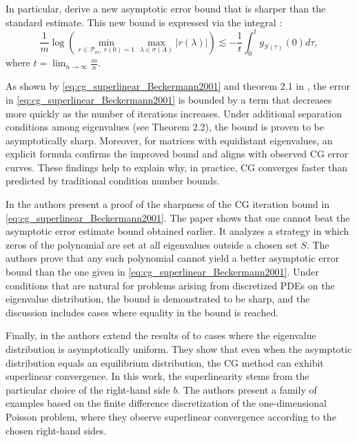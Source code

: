In particular, \citeauthor{cg_superlinear_Beckermann2001} derive a new asymptotic error bound that is sharper than the standard estimate. This new bound is expressed via the integral \cite[Equation 1.8]{cg_superlinear_Beckermann2001}:
\begin{equation}
    \frac{1}{m} \log \left(\min_{r\in\mathcal{P}_m, \ r(0)=1}\max_{\lambda \in \sigma(A)}|r(\lambda)|\right) \lesssim-\frac{1}{t} \int_0^t g_{S(\tau)}(0) d \tau,
    \label{eq:cg_superlinear_Beckermann2001}
\end{equation}
where $t = \lim_{n\to\infty}\frac{m}{n}$.

As shown by \cref{eq:cg_superlinear_Beckermann2001} and theorem 2.1 in \cite{cg_sharp_bound_Beckermann2001}, the error in \cref{eq:cg_superlinear_Beckermann2001} is bounded by a term that decreases more quickly as the number of iterations increases. Under additional separation conditions among eigenvalues (see Theorem 2.2), the bound is proven to be asymptotically sharp. Moreover, for matrices with equidistant eigenvalues, an explicit formula \cite[Corollary 3.2 and Equation 3.11]{cg_superlinear_Beckermann2001} confirms the improved bound and aligns with observed CG error curves. These findings help to explain why, in practice, CG converges faster than predicted by traditional condition number bounds.

In \cite{cg_sharp_bound_Beckermann2001} the authors present a proof of the sharpness of the CG iteration bound in \cref{eq:cg_superlinear_Beckermann2001}. The paper shows that one cannot beat the asymptotic error estimate bound obtained earlier. It analyzes a strategy in which zeros of the polynomial are set at all eigenvalues outside a chosen set $S$. The authors prove that any such polynomial cannot yield a better asymptotic error bound than the one given in \cref{eq:cg_superlinear_Beckermann2001}. Under conditions that are natural for problems arising from discretized PDEs on the eigenvalue distribution, the bound is demonstrated to be sharp, and the discussion includes cases where equality in the bound is reached.

Finally, in \cite{cg_superlinear_rhs_Beckermann2002} the authors extend the results of \cite{cg_superlinear_Beckermann2001} to cases where the eigenvalue distribution is asymptotically uniform. They show that even when the asymptotic distribution equals an equilibrium distribution, the CG method can exhibit superlinear convergence. In this work, the superlinearity stems from the particular choice of the right-hand side $b$. The authors present a family of examples based on the finite difference discretization of the one-dimensional Poisson problem, where they observe superlinear convergence according to the chosen right-hand sides.
